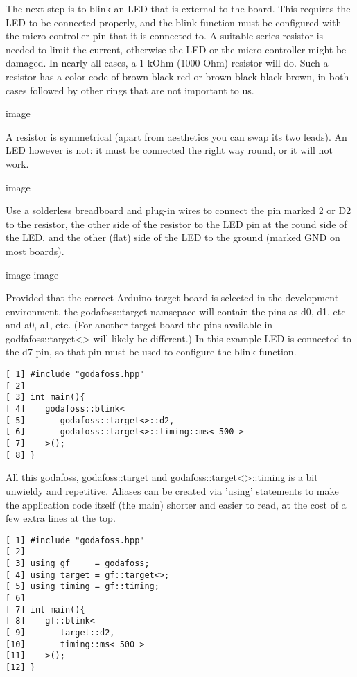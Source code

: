 \documentclass{article}
\begin{document}
The next step is to blink an LED that is external to the board.
This requires the LED to be connected properly, and
the blink function must be configured with the micro-controller
pin that it is connected to.
A suitable series resistor is needed to limit the current,
otherwise the LED or the micro-controller might be damaged.
In nearly all cases, a 1 kOhm (1000 Ohm) resistor will do.
Such a resistor has a color code of brown-black-red
or brown-black-black-brown,
in both cases followed by other rings that are not important to us.

image

A resistor is symmetrical (apart from aesthetics you can swap its two leads).
An LED however is not: it must be connected the right way round,
or it will not work.

image

Use a solderless breadboard and plug-in wires to connect
the pin marked 2 or D2 to the resistor,
the other side of the resistor to the LED pin at the round side
of the LED, and the other (flat) side of the LED to the ground
(marked GND on most boards).

image
image

Provided that the correct Arduino target board is selected in the
development environment, the godafoss::target namsepace will contain
the pins as d0, d1, etc and a0, a1, etc.
(For another target board the pins available in godfafoss::target<>
will likely be different.)
In this example LED is connected to the d7 pin,
so that pin must be used to configure the blink function.

\lstset {language=C++}
\begin{lstlisting}
[ 1] #include "godafoss.hpp"
[ 2]
[ 3] int main(){
[ 4]    godafoss::blink<
[ 5]       godafoss::target<>::d2,
[ 6]       godafoss::target<>::timing::ms< 500 >
[ 7]    >();
[ 8] }
\end{lstlisting}

All this godafoss, godafoss::target and godafoss::target<>::timing
is a bit unwieldy and repetitive.
Aliases can be created via 'using' statements to make the application
code itself (the main) shorter and easier to read, at the cost of
a few extra lines at the top.

\lstset {language=C++}
\begin{lstlisting}
[ 1] #include "godafoss.hpp"
[ 2]
[ 3] using gf     = godafoss;
[ 4] using target = gf::target<>;
[ 5] using timing = gf::timing;
[ 6]
[ 7] int main(){
[ 8]    gf::blink<
[ 9]       target::d2,
[10]       timing::ms< 500 >
[11]    >();
[12] }
\end{lstlisting}
\end{document}
